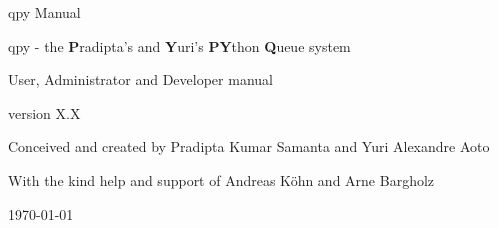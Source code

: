 \begin{titlepage}

\begin{center}
  qpy Manual
\end{center}\vspace{3.0cm}

\begin{center}
\begin{minipage}{0.9\textwidth}
\begin{center}
  {\textsf{\Large qpy - the \textbf{P}radipta's and \textbf{Y}uri's \textbf{PY}thon \textbf{Q}ueue system}}\\[0.5cm]
\end{center}
\end{minipage}
\end{center}

\begin{center}
{\large User, Administrator and Developer manual}
\end{center}

version X.X\\[3.0cm]

\begin{flushleft}
Conceived and created by Pradipta Kumar Samanta and Yuri Alexandre Aoto\\\vspace{1.0cm}

With the kind help and support of Andreas K{\"o}hn and Arne Bargholz\\

\end{flushleft}



\vfill
\begin{center}
{\large \today}
\end{center}

\end{titlepage}

